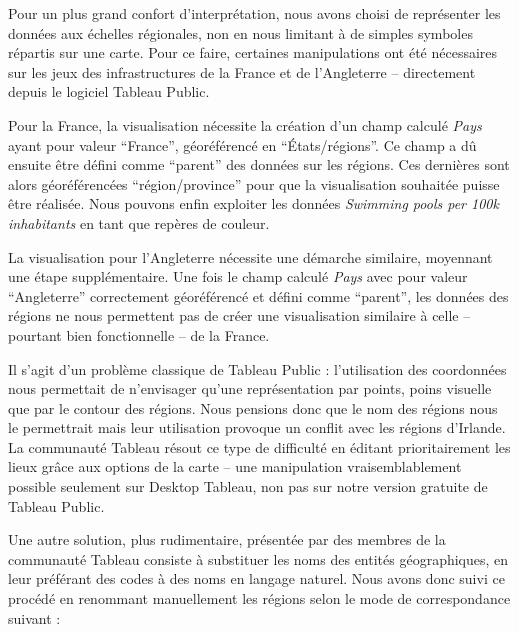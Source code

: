 \documentclass[hidelinks, 12pt]{report}
\begin{document}
Pour un plus grand confort d'interprétation, nous avons choisi de représenter les données aux échelles régionales, non en nous limitant à de simples symboles répartis sur une carte. Pour ce faire, certaines manipulations ont été nécessaires sur les jeux des infrastructures de la France et de l’Angleterre -- directement depuis le logiciel Tableau Public.

Pour la France, la visualisation nécessite la création d'un champ calculé \textit{Pays} ayant pour valeur \enquote{France}, géoréférencé en \enquote{États/régions}. Ce champ a dû ensuite être défini comme \enquote{parent} des données sur les régions. Ces dernières sont alors géoréférencées \enquote{région/province} pour que la visualisation souhaitée puisse être réalisée. Nous pouvons enfin exploiter les données \textit{Swimming pools per 100k inhabitants} en tant que repères de couleur.

La visualisation pour l'Angleterre nécessite une démarche similaire, moyennant une étape supplémentaire. Une fois le champ calculé \textit{Pays} avec pour valeur \enquote{Angleterre} correctement géoréférencé et défini comme \enquote{parent}, les données des régions ne nous permettent pas de créer une visualisation similaire à celle -- pourtant bien fonctionnelle -- de la France.

Il s'agit d'un problème classique de Tableau Public : l'utilisation des coordonnées nous permettait de n'envisager qu'une représentation par points, poins visuelle que par le contour des régions. Nous pensions donc que le nom des régions nous le permettrait mais leur utilisation provoque un conflit avec les régions d'Irlande. La communauté Tableau résout ce type de difficulté en éditant prioritairement les lieux grâce aux options de la carte -- une manipulation vraisemblablement possible seulement sur Desktop Tableau, non pas sur notre version gratuite de Tableau Public.

Une autre solution, plus rudimentaire, présentée par des membres de la communauté Tableau consiste à substituer les noms des entités géographiques, en leur préférant des codes à des noms en langage naturel. Nous avons donc suivi ce procédé en renommant manuellement les régions selon le mode de correspondance suivant :
\end{document}
